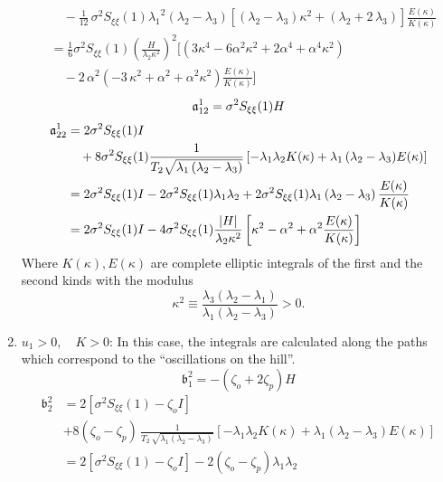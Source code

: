 \begin{enumerate}
\begin{align*}
&\quad -\frac{1}{12}\,{\sigma}^2S_{\xi\xi}(1){\lambda_1}^2\left
(\lambda_2-\lambda_{{ 3}}\right)\left[\left
(\lambda_2-\lambda_{{ 3}}\right){\kappa}^2+\left
(\lambda_2+2\,\lambda_3\right)\right] \frac{E(\kappa)}{K(\kappa)}\\
& = \frac{1}{6} \sigma^2 S_{\xi\xi}(1) \left(\frac{H}{\lambda_2 \kappa^2} \right)^2 \biggl[ \left(3 \kappa^4 - 6 \alpha^2 \kappa^2 + 2 \alpha^4 + \alpha^4 \kappa^2 \right)\\
&\quad -2\,{\alpha}^2\left(-3\,{\kappa}^2+{\alpha}^2+{\alpha}^2{\kappa}^2\right)\frac{E(\kappa)}{K(\kappa)} \biggr]
\end{align*}
\[
\mathfrak a_{12}^1 = \sigma^2 S_{\xi\xi}(1) H
\]
\begin{align*}
\mathfrak a_{22}^1 &= 2 \sigma^2 S_{\xi\xi}(1){I}\\
&\quad + 8 \sigma^2 S_{\xi\xi}(1) \frac{1}{T_2 \sqrt{\lambda_1\left(\lambda_2 - \lambda_3 \right)}}\left[ -\lambda_1 \lambda_2 K(\kappa) + {\lambda_1\left(\lambda_2 - \lambda_3 \right)} E(\kappa) \right]\\
& = 2 \sigma^2 S_{\xi\xi}(1)I - 2 \sigma^2 S_{\xi\xi}(1) \lambda_1 \lambda_2 + 2 \sigma^2 S_{\xi\xi}(1) \lambda_1 \left(\lambda_2 - \lambda_3\right) \frac{E(\kappa)}{K(\kappa)}\\
& = 2 \sigma^2 S_{\xi\xi}(1) I - 4 \sigma^2 S_{\xi\xi}(1) \frac{|H|}{\lambda_2 \kappa^2} \left[\kappa^2 - \alpha^2 + \alpha^2 \frac{E(\kappa)}{K(\kappa)}\right]
\end{align*}
Where $K(\kappa), E(\kappa)$ are complete elliptic integrals of the first and the second kinds with the modulus
\[
\kappa^2 \equiv \frac{\lambda_3(\lambda_2 - \lambda_1)}{\lambda_1(\lambda_2 - \lambda_3)} > 0.
\]
\item $u_1 > 0, \quad K > 0$: In this case, the integrals are calculated along the paths which correspond to the ``oscillations on the hill''.
\begin{equation}
\label{e:b1 hill}
\mathfrak{b}_1^2 = -(\zeta_o+2\zeta_p) H
\end{equation}
\begin{align*}
\mathfrak b_2^2 &= 2[\sigma^2 S_{\xi\xi}(1) - \zeta_o I]\\
& + 8 (\zeta_o - \zeta_p)\,\frac{1}{T_2\,\sqrt{\lambda_1\left(\lambda_2 - \lambda_3 \right)}}\left[ -\lambda_1 \lambda_2 K(\kappa) + {\lambda_1 \left(\lambda_2 - \lambda_3 \right)} E(\kappa) \right]\\
&= 2 [\sigma^2 S_{\xi\xi}(1) - \zeta_o I] - 2 \left(\zeta_o - \zeta_p\right) \lambda_1 \lambda_2\\

\end{align*}
\end{enumerate}
